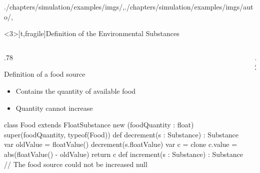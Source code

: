 \begin{graphicspathcontext}{{./chapters/simulation/examples/imgs/},{./chapters/simulation/examples/imgs/auto/},\old}
\begin{frame}<3>[t,fragile]{Definition of the Environmental Substances \insertcontinuationtext}
	\vspace{-.5cm}
	\smaller
	\begin{columns}
		\begin{column}[t]{.78\linewidth}
			\begin{block}{Definition of a food source}
				\begin{itemize}
				\item Contains the quantity of available food
				\item Quantity cannot increase
				\end{itemize}
			\end{block}
			\begin{sarllisting}[basicstyle=\scriptsize]
class Food extends FloatSubstance {
  new (foodQuantity : float) {
   super(foodQuantity, typeof(Food))
  }
  def decrement(s : Substance) : Substance {
   var oldValue = floatValue()
   decrement(s.floatValue)
   var c = clone
   c.value = abs(floatValue() - oldValue)
   return c
  }
  def increment(s : Substance) : Substance {
   // The food source could not be increased
   null
  }
}
			\end{sarllisting}
		\end{column}
		\begin{column}[t]{.2\linewidth}
		\end{column}
	\end{columns}
\end{frame}


\end{graphicspathcontext}

